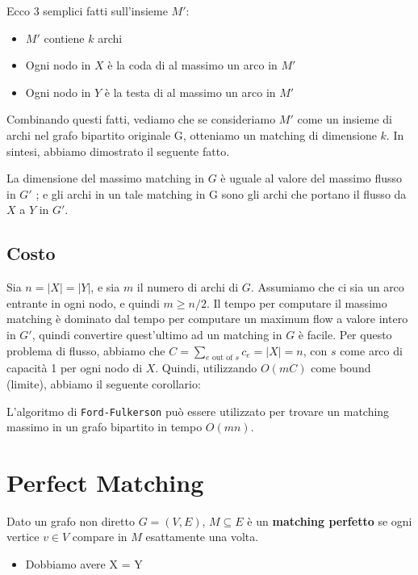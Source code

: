 Ecco 3 semplici fatti sull'insieme $M'$:
\begin{itemize}
    \item $M'$ contiene $k$ archi
    \item Ogni nodo in $X$ è la coda di al massimo un arco in $M'$
    \item Ogni nodo in $Y$ è la testa di al massimo un arco in $M'$
\end{itemize}

Combinando questi fatti, vediamo che se consideriamo $M'$ come un
insieme di archi nel grafo bipartito originale G, otteniamo un matching
di dimensione $k$. In sintesi, abbiamo dimostrato il seguente fatto.

\begin{myblockquote}
La dimensione del massimo matching in $G$ è uguale al valore del
massimo flusso in $G'$ ; e gli archi in un tale matching in G sono gli
archi che portano il flusso da $X$ a $Y$ in $G'$.
\end{myblockquote}

\subsection{Costo}

Sia $n = |X| = |Y|$, e sia $m$ il numero di archi di $G$.
Assumiamo che ci sia un arco entrante in ogni nodo, e quindi
$m \ge n/2$. Il tempo per computare il massimo matching è dominato dal
tempo per computare un maximum flow a valore intero in $G'$, quindi
convertire quest'ultimo ad un matching in $G$ è facile. Per questo
problema di flusso, abbiamo che
$C = \sum_{e \text{ out of } s}c_e = |X| = n$, con $s$ come arco di
capacità 1 per ogni nodo di $X$. Quindi, utilizzando $O(mC)$ come
bound (limite), abbiamo il seguente corollario:
\begin{myblockquote}
    L'algoritmo di \texttt{Ford-Fulkerson} può essere utilizzato per trovare 
    un matching massimo in un grafo bipartito in tempo $O(mn)$.
\end{myblockquote}


\section{Perfect Matching}

Dato un grafo non diretto $G=(V,E)$, $M \subseteq E$ è un
\textbf{matching perfetto} se ogni vertice $v \in V$ compare in $M$
esattamente una volta.
\begin{itemize}
    \item Dobbiamo avere \textbar X\textbar{} = \textbar Y\textbar{}
\end{itemize}

